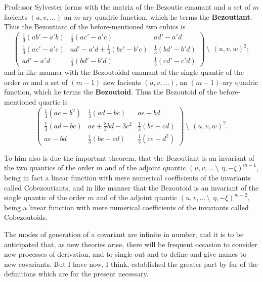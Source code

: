 \documentclass[11pt,a4paper]{book}
\begin{document}
\begin{center}
Professor Sylvester forms with the matrix of the Bezoutic emanant and a set of $m$ facients $(u, v, \ldots)$ an $m$-ary quadric function, which he terms the \textbf{Bezoutiant}. Thus the Bezoutiant of the before-mentioned two cubics is
\[
\begin{pmatrix}
\frac{1}{3}(ab' - a'b) & \frac{1}{3}(ac' - a'c) & ad' - a'd \\
\frac{1}{3}(ac' - a'c) & ad' - a'd + \frac{1}{3}(bc' - b'c) & \frac{1}{3}(bd' - b'd) \\
ad' - a'd & \frac{1}{3}(bd' - b'd) & \frac{1}{3}(cd' - c'd)
\end{pmatrix}
\,\setminus\!\!\:\, (u, v, w)^2;
\]
and in like manner with the Bezoutoidal emanant of the single quantic of the order $m$ and a set of $(m - 1)$ new facients $(u, v, \ldots)$, an $(m - 1)$-ary quadric function, which he terms the \textbf{Bezoutoid}. Thus the Bezoutoid of the before-mentioned quartic is
\[
\begin{pmatrix}
\frac{1}{3}(ac - b^2) & \frac{1}{3}(ad - bc) & ae - bd \\
\frac{1}{3}(ad - bc) & ae + \frac{8}{3}bd - 3c^2 & \frac{1}{3}(be - cd) \\
ae - bd & \frac{1}{3}(be - cd) & \frac{1}{3}(ce - d^2)
\end{pmatrix}
\,\setminus\!\!\:\, (u, v, w)^2.
\]

To him also is due the important theorem, that the Bezoutiant is an invariant of the two quantics of the order $m$ and of the adjoint quantic $(u, v, \ldots \,\setminus\!\!\:\, \eta, -\xi)^{m-1}$, being in fact a linear function with mere numerical coefficients of the invariants called Cobezoutiants, and in like manner that the Bezoutoid is an invariant of the single quantic of the order $m$ and of the adjoint quantic $(u, v, \ldots \,\setminus\!\!\:\, \eta, -\xi)^{m-2}$, being a linear function with mere numerical coefficients of the invariants called Cobezoutoids.

The modes of generation of a covariant are infinite in number, and it is to be anticipated that, as new theories arise, there will be frequent occasion to consider new processes of derivation, and to single out and to define and give names to new covariants. But I have now, I think, established the greater part by far of the definitions which are for the present necessary.




\end{center}
\end{document}
